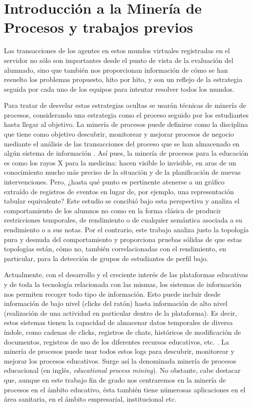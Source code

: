 \chapter{Introducción a la Minería de Procesos y trabajos previos}\label{sec:chapterII}

Las transacciones de los agentes en estos mundos virtuales registradas en el servidor no sólo son importantes desde el punto de vista de la evaluación del alumnado, sino que también nos proporcionan información de cómo se han resuelto los problemas propuesto, hito por hito, y son un reflejo de la estrategia seguida por cada uno de los equipos para intentar resolver todos los mundos.

Para tratar de desvelar estas estrategias ocultas se usarán técnicas de minería de procesos, considerando una estrategia como el proceso seguido por los estudiantes hasta llegar al objetivo. La minería de procesos puede definirse como la disciplina que tiene como objetivo descubrir, monitorear y mejorar procesos de negocio mediante el análisis de las transacciones del proceso que se han almacenado en algún sistema de información \citep{Mayorga_2015}. Así pues, la minería de procesos para la educación es como los rayos X para la medicina: hacen visible lo invisible, en aras de un conocimiento mucho más preciso de la situación y de la planificación de nuevas intervenciones. Pero, ¿hasta qué punto es pertinente atenerse a un gráfico extraído de registros de eventos en lugar de, por ejemplo, una representación tabular equivalente? Este estudio se concibió bajo esta perspectiva y analiza el comportamiento de los alumnos no como en la forma clásica de producir restricciones temporales, de rendimiento o de cualquier semántica asociada a su rendimiento o a sus notas. Por el contrario, este trabajo analiza justo la topología pura y desnuda del comportamiento y proporciona pruebas sólidas de que estas topologías están, cómo no, también correlacionadas con el rendimiento, en particular, para la detección de grupos de estudiantes de perfil bajo.

Actualmente, con el desarrollo y el creciente interés de las plataformas educativas y de toda la tecnología relacionada con las mismas, los sistemas de información nos permiten recoger todo tipo de información. Esto puede incluir desde información de bajo nivel (clicks del ratón) hasta información de alto nivel (realización de una actividad en particular dentro de la plataforma). Es decir, estos sistemas tienen la capacidad de almacenar datos temporales de diversa índole, como cadenas de clicks, registros de chats, históricos de modificación de documentos, registros de uso de los diferentes recursos educativos, etc. \cite{bogarin2018survey}. La minería de procesos puede usar todos estos logs para descubrir, monitorear y mejorar los procesos educativos. Surge así la denominada minería de procesos educacional (en inglés, \emph{educational process mining}). No obstante, cabe destacar que, aunque en este trabajo fin de grado nos centraremos en la minería de procesos en el ámbito educativo, ésta también tiene númerosas aplicaciones en el área sanitaria, en el ámbito empresarial, institucional etc.

